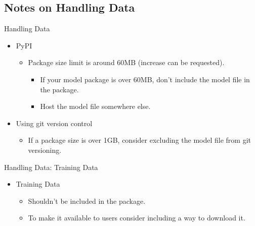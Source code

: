 \documentclass[10pt]{beamer}
\begin{document}

\subsection{Notes on Handling Data}

\begin{frame}[fragile]{Handling Data}

  \begin{itemize}
    \item PyPI
      \begin{itemize}
        \item Package size limit is around 60MB (increase can be requested).
          \begin{itemize}
            \item If your model package is over 60MB, don't include the model file in the package.
            \item Host the model file somewhere else.
          \end{itemize}
      \end{itemize}
    \item Using git version control
      \begin{itemize}
        \item If a package size is over 1GB, consider excluding the model file from git versioning.
      \end{itemize}
  \end{itemize}

\end{frame}


\begin{frame}[fragile]{Handling Data: Training Data}
  \begin{itemize}
    \item Training Data
      \begin{itemize}
        \item Shouldn't be included in the package.
        \item To make it available to users consider including a way to download it.
      \end{itemize}
  \end{itemize}

\end{frame}
\end{document}
